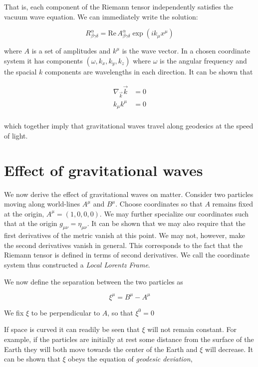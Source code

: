 That is, each component of the Riemann tensor independently 
satisfies the vacuum wave equation.  We can immediately write the
solution:

\begin{equation}
R^\alpha_{\beta\gamma\delta} = 
\textrm{Re}\, A^\alpha_{\beta\gamma\delta} \exp(i k_\mu x^\mu)
\end{equation}

where $A$ is a set of amplitudes and $k^\mu$ is the wave vector.  In a
chosen coordinate system it has components $(\omega, k_x, k_y, k_z)$
where $\omega$ is the angular frequency and the spacial $k$ components
are wavelengths in each direction.  It can be shown that 

\begin{align*}
\nabla_{\vec k} \vec{k} &= 0 \\
k_\mu k^\mu &= 0 \\
\end{align*}

which together imply that gravitational waves travel along geodesics 
at the speed of light.


\section{Effect of gravitational waves}
\label{sec:effects_of_waves}

We now derive the effect of gravitational waves on matter.  Consider
two particles moving along world-lines $A^\mu$ and $B^\mu$.  Choose
coordinates so that $A$ remains fixed at the origin, $A^\mu =
(1,0,0,0)$.  We may further specialize our coordinates such that at
the origin $g_{\mu\nu} = \eta_{\mu\nu}$.  It can be shown that we may
also require that the first derivatives of the metric vanish at this
point.  We may not, however, make the second derivatives vanish in
general.  This corresponds to the fact that the Riemann tensor is
defined in terms of second derivatives.  We call the coordinate system
thus constructed a \emph{Local Lorentz Frame}.

We now define the separation between the two particles as 

\begin{equation*}
\xi^\mu = B^\mu - A^\mu
\end{equation*}

We fix $\xi$ to be perpendicular to $A$, so that $\xi^0 = 0$

If space is curved it can readily be seen that $\xi$ will not remain
constant.  For example, if the particles are initially at rest some
distance from the surface of the Earth they will both move towards 
the center of the Earth and $\xi$ will decrease.  It can be shown that 
$\xi$ obeys the equation of \emph{geodesic deviation},

